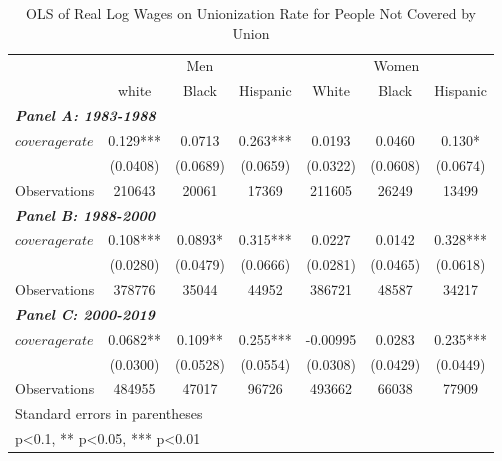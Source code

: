 \begin{table}[h!]\centering
\def\sym#1{\ifmmode^{#1}\else\(^{#1}\)\fi}
\caption{OLS of Real Log Wages on Unionization Rate for People Not Covered by Union}\label{tab:nlincovrate}
\fontsize{10}{11}\selectfont
\begin{tabular}{l*{6}{c}}
\hline
&\multicolumn{3}{c}{Men}                        &\multicolumn{3}{c}{Women}                      \\\cmidrule(lr){2-4}\cmidrule(lr){5-7}
&\multicolumn{1}{c}{white}&\multicolumn{1}{c}{Black}&\multicolumn{1}{c}{Hispanic}&\multicolumn{1}{c}{White}&\multicolumn{1}{c}{Black}&\multicolumn{1}{c}{Hispanic}\\
\hline
\multicolumn{3}{l}{\linebreak \textbf{\textit{Panel A: 1983-1988}}} \\
$ coveragerate $    &       0.129***&      0.0713   &       0.263***&      0.0193   &      0.0460   &       0.130*  \\
&    (0.0408)   &    (0.0689)   &    (0.0659)   &    (0.0322)   &    (0.0608)   &    (0.0674)   \\
\hline
Observations        &      210643   &       20061   &       17369   &      211605   &       26249   &       13499   \\
\hline
\multicolumn{3}{l}{\linebreak \textbf{\textit{Panel B: 1988-2000}}} \\
$ coveragerate $    &       0.108***&      0.0893*  &       0.315***&      0.0227   &      0.0142   &       0.328***\\
&    (0.0280)   &    (0.0479)   &    (0.0666)   &    (0.0281)   &    (0.0465)   &    (0.0618)   \\
\hline
Observations        &      378776   &       35044   &       44952   &      386721   &       48587   &       34217   \\
\hline
\multicolumn{3}{l}{\linebreak \textbf{\textit{Panel C: 2000-2019}}} \\
$ coveragerate $    &      0.0682** &       0.109** &       0.255***&    -0.00995   &      0.0283   &       0.235***\\
&    (0.0300)   &    (0.0528)   &    (0.0554)   &    (0.0308)   &    (0.0429)   &    (0.0449)   \\
\hline
Observations        &      484955   &       47017   &       96726   &      493662   &       66038   &       77909   \\
\hline\hline
\multicolumn{7}{l}{\footnotesize Standard errors in parentheses}\\
\multicolumn{7}{l}{\footnotesize * p<0.1, ** p<0.05, *** p<0.01}\\
\end{tabular}
\end{table}
